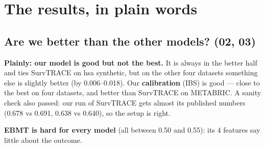 \documentclass[11pt]{article}
\begin{document}
\section{The results, in plain words}

\subsection{Are we better than the other models? (02, 03)}
\begin{table}[H]
\centering
{}
\end{table}
\textbf{Plainly: our model is good but not the best.} It is always in the better half and ties
SurvTRACE on hsa synthetic, but on the other four datasets something else is slightly better (by
0.006--0.018). Our \textbf{calibration} (IBS) is good --- close to the best on four datasets, and
better than SurvTRACE on METABRIC. A sanity check also passed: our run of SurvTRACE gets almost its
published numbers (0.678 vs 0.691, 0.638 vs 0.640), so the setup is right.

\textbf{EBMT is hard for every model} (all between 0.50 and 0.55): its 4 features say little about the
outcome.
\end{document}
